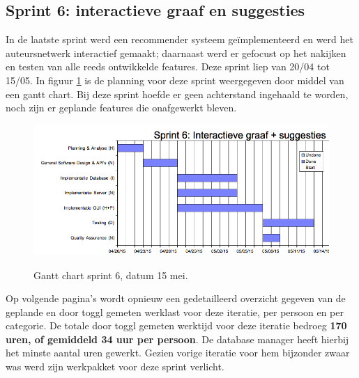 \documentclass{article}
\begin{document}


\clearpage
\subsection{Sprint 6:  interactieve graaf en suggesties}
In de laatste sprint werd een recommender systeem ge\"implementeerd en werd het auteursnetwerk interactief gemaakt; daarnaast werd er gefocust op het nakijken en testen van alle reeds ontwikkelde features. Deze sprint liep van 20/04 tot 15/05. In figuur \ref{gantt_S6} is de planning voor deze sprint weergegeven door middel van een gantt chart. Bij deze sprint hoefde er geen achterstand ingehaald te worden, noch zijn er geplande features die onafgewerkt bleven. 

\begin{figure}[h!]
\centering
 \includegraphics[width=150mm]{Gantt_S6_15mei.png}
 \label{gantt_S6}
 \caption{Gantt chart sprint 6, datum 15 mei. }
\end{figure}

\noindent Op volgende pagina's wordt opnieuw een gedetailleerd overzicht gegeven van de geplande en door toggl gemeten werklast voor deze iteratie, per persoon en per categorie. De totale door toggl gemeten werktijd voor deze iteratie bedroeg \textbf{170 uren, of gemiddeld 34 uur per persoon}. De database manager heeft hierbij het minste aantal uren gewerkt. Gezien vorige iteratie voor hem bijzonder zwaar was werd zijn werkpakket voor deze sprint verlicht.



\end{document}
